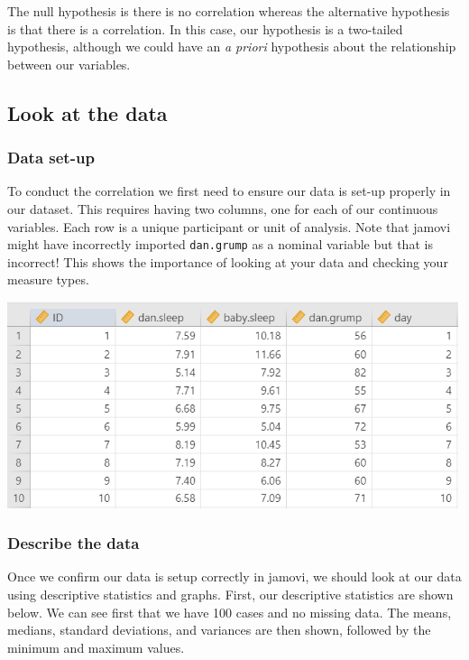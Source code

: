 \documentclass[
]{book}
\begin{document}
The null hypothesis is there is no correlation whereas the alternative hypothesis is that there is a correlation. In this case, our hypothesis is a two-tailed hypothesis, although we could have an \emph{a priori} hypothesis about the relationship between our variables.

\hypertarget{look-at-the-data-8}{%
\subsection{Look at the data}\label{look-at-the-data-8}}

\hypertarget{data-set-up-8}{%
\subsubsection{Data set-up}\label{data-set-up-8}}

To conduct the correlation we first need to ensure our data is set-up properly in our dataset. This requires having two columns, one for each of our continuous variables. Each row is a unique participant or unit of analysis. Note that jamovi might have incorrectly imported \texttt{dan.grump} as a nominal variable but that is incorrect! This shows the importance of looking at your data and checking your measure types.

\includegraphics[width=5.20833in,height=\textheight]{images/08-correlation/correlation-data.png}

\hypertarget{describe-the-data-6}{%
\subsubsection{Describe the data}\label{describe-the-data-6}}

Once we confirm our data is setup correctly in jamovi, we should look at our data using descriptive statistics and graphs. First, our descriptive statistics are shown below. We can see first that we have 100 cases and no missing data. The means, medians, standard deviations, and variances are then shown, followed by the minimum and maximum values.
\end{document}
